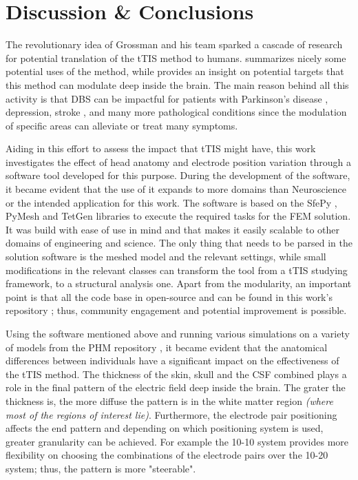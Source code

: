\pagebreak
\chapter{Discussion \& Conclusions}
\label{sec:discussion}

The revolutionary idea of Grossman and his team sparked a cascade of research for potential translation of the \gls{tTIS} method to humans.  summarizes nicely some potential uses of the method, while  provides an insight on potential targets that this method can modulate deep inside the brain. The main reason behind all this activity is that \gls{DBS} can be impactful for patients with Parkinson's disease \cite{Cagnan2019}, depression, stroke \cite{Bao2020}, and many more \cite{Cagnan2019,Polania2018} pathological conditions since the modulation of specific areas can alleviate or treat many symptoms.

Aiding in this effort to assess the impact that \gls{tTIS} might have, this work investigates the effect of head anatomy and electrode position variation through a software tool developed for this purpose. During the development of the software, it became evident that the use of it expands to more domains than Neuroscience or the intended application for this work. The software is based on the SfePy \cite{Cimrman2019}, PyMesh \cite{pymesh} and TetGen \cite{tetgen} libraries to execute the required tasks for the \gls{FEM} solution. It was build with ease of use in mind and that makes it easily scalable to other domains of engineering and science. The only thing that needs to be parsed in the solution software is the meshed model and the relevant settings, while small modifications in the relevant classes can transform the tool from a \gls{tTIS} studying framework, to a structural analysis one. Apart from the modularity, an important point is that all the code base in open-source and can be found in this work's repository \cite{thesis_repo}; thus, community engagement and potential improvement is possible.

Using the software mentioned above and running various simulations on a variety of models from the \gls{PHM} repository \cite{Lee2016,Lee2018,ErikG.Lee2016}, it became evident that the anatomical differences between individuals have a significant impact on the effectiveness of the \gls{tTIS} method. The thickness of the skin, skull and the \gls{CSF} combined plays a  role in the final pattern of the electric field deep inside the brain. The grater the thickness is, the more diffuse the pattern is in the white matter region \textit{(where most of the regions of interest lie)}. Furthermore, the electrode pair positioning affects the end pattern and depending on which positioning system is used, greater granularity can be achieved. For example the 10-10 system provides more flexibility on choosing the combinations of the electrode pairs over the 10-20 system; thus, the pattern is more "steerable".

